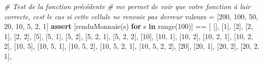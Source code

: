 \documentclass[
  paper=a4,
  ,captions=tableheading
]{scrartcl}
\newenvironment{Shaded}{}{}
\newcommand{\BuiltInTok}[1]{\textcolor[rgb]{0.00,0.50,0.00}{#1}}
\newcommand{\CommentTok}[1]{\textcolor[rgb]{0.38,0.63,0.69}{\textit{#1}}}
\newcommand{\ControlFlowTok}[1]{\textcolor[rgb]{0.00,0.44,0.13}{\textbf{#1}}}
\newcommand{\DecValTok}[1]{\textcolor[rgb]{0.25,0.63,0.44}{#1}}
\newcommand{\KeywordTok}[1]{\textcolor[rgb]{0.00,0.44,0.13}{\textbf{#1}}}
\newcommand{\NormalTok}[1]{#1}
\newcommand{\OperatorTok}[1]{\textcolor[rgb]{0.40,0.40,0.40}{#1}}
\begin{document}
\begin{Shaded}
\begin{Highlighting}[]
\CommentTok{\# Test de la fonction précédente}
\CommentTok{\# me permet de voir que votre fonction à l\textquotesingle{}air correcte, c\textquotesingle{}est le cas si cette cellule ne renvoie pas d\textquotesingle{}erreur}
\NormalTok{valeurs }\OperatorTok{=}\NormalTok{ [}\DecValTok{200}\NormalTok{, }\DecValTok{100}\NormalTok{, }\DecValTok{50}\NormalTok{, }\DecValTok{20}\NormalTok{, }\DecValTok{10}\NormalTok{, }\DecValTok{5}\NormalTok{, }\DecValTok{2}\NormalTok{, }\DecValTok{1}\NormalTok{]}
\ControlFlowTok{assert}\NormalTok{ [renduMonnaie(s) }\ControlFlowTok{for}\NormalTok{ s }\KeywordTok{in} \BuiltInTok{range}\NormalTok{(}\DecValTok{100}\NormalTok{)] }\OperatorTok{==}\NormalTok{ [}
\NormalTok{    [],}
\NormalTok{    [}\DecValTok{1}\NormalTok{],}
\NormalTok{    [}\DecValTok{2}\NormalTok{],}
\NormalTok{    [}\DecValTok{2}\NormalTok{, }\DecValTok{1}\NormalTok{],}
\NormalTok{    [}\DecValTok{2}\NormalTok{, }\DecValTok{2}\NormalTok{],}
\NormalTok{    [}\DecValTok{5}\NormalTok{],}
\NormalTok{    [}\DecValTok{5}\NormalTok{, }\DecValTok{1}\NormalTok{],}
\NormalTok{    [}\DecValTok{5}\NormalTok{, }\DecValTok{2}\NormalTok{],}
\NormalTok{    [}\DecValTok{5}\NormalTok{, }\DecValTok{2}\NormalTok{, }\DecValTok{1}\NormalTok{],}
\NormalTok{    [}\DecValTok{5}\NormalTok{, }\DecValTok{2}\NormalTok{, }\DecValTok{2}\NormalTok{],}
\NormalTok{    [}\DecValTok{10}\NormalTok{],}
\NormalTok{    [}\DecValTok{10}\NormalTok{, }\DecValTok{1}\NormalTok{],}
\NormalTok{    [}\DecValTok{10}\NormalTok{, }\DecValTok{2}\NormalTok{],}
\NormalTok{    [}\DecValTok{10}\NormalTok{, }\DecValTok{2}\NormalTok{, }\DecValTok{1}\NormalTok{],}
\NormalTok{    [}\DecValTok{10}\NormalTok{, }\DecValTok{2}\NormalTok{, }\DecValTok{2}\NormalTok{],}
\NormalTok{    [}\DecValTok{10}\NormalTok{, }\DecValTok{5}\NormalTok{],}
\NormalTok{    [}\DecValTok{10}\NormalTok{, }\DecValTok{5}\NormalTok{, }\DecValTok{1}\NormalTok{],}
\NormalTok{    [}\DecValTok{10}\NormalTok{, }\DecValTok{5}\NormalTok{, }\DecValTok{2}\NormalTok{],}
\NormalTok{    [}\DecValTok{10}\NormalTok{, }\DecValTok{5}\NormalTok{, }\DecValTok{2}\NormalTok{, }\DecValTok{1}\NormalTok{],}
\NormalTok{    [}\DecValTok{10}\NormalTok{, }\DecValTok{5}\NormalTok{, }\DecValTok{2}\NormalTok{, }\DecValTok{2}\NormalTok{],}
\NormalTok{    [}\DecValTok{20}\NormalTok{],}
\NormalTok{    [}\DecValTok{20}\NormalTok{, }\DecValTok{1}\NormalTok{],}
\NormalTok{    [}\DecValTok{20}\NormalTok{, }\DecValTok{2}\NormalTok{],}
\NormalTok{    [}\DecValTok{20}\NormalTok{, }\DecValTok{2}\NormalTok{, }\DecValTok{1}\NormalTok{],}

\end{Highlighting}
\end{Shaded}
\end{document}
